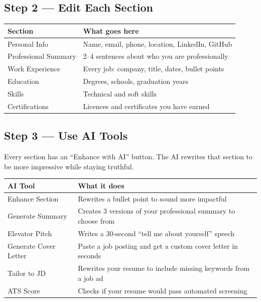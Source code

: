 \documentclass[12pt, a4paper]{report}
\begin{document}
\subsection{Step 2 --- Edit Each Section}

\begin{center}
\begin{tabularx}{\textwidth}{lX}
\toprule
\textbf{Section} & \textbf{What goes here} \\
\midrule
Personal Info        & Name, email, phone, location, LinkedIn, GitHub \\
Professional Summary & 2--4 sentences about who you are professionally \\
Work Experience      & Every job: company, title, dates, bullet points \\
Education            & Degrees, schools, graduation years \\
Skills               & Technical and soft skills \\
Certifications       & Licences and certificates you have earned \\
\bottomrule
\end{tabularx}
\end{center}

\subsection{Step 3 --- Use AI Tools}

Every section has an ``Enhance with AI'' button.  The AI rewrites that section to
be more impressive while staying truthful.

\begin{center}
\begin{tabularx}{\textwidth}{lX}
\toprule
\textbf{AI Tool} & \textbf{What it does} \\
\midrule
Enhance Section      & Rewrites a bullet point to sound more impactful \\
Generate Summary     & Creates 3 versions of your professional summary to choose from \\
Elevator Pitch       & Writes a 30-second ``tell me about yourself'' speech \\
Generate Cover Letter & Paste a job posting and get a custom cover letter in seconds \\
Tailor to JD         & Rewrites your resume to include missing keywords from a job ad \\
ATS Score            & Checks if your resume would pass automated screening \\
\bottomrule
\end{tabularx}
\end{center}
\end{document}
